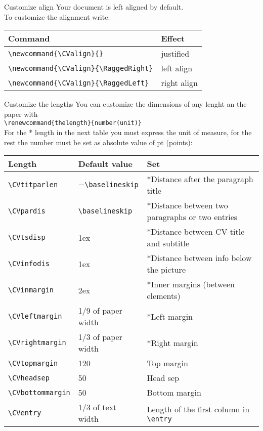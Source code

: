 \documentclass[english]{michael-cv}
\begin{document}
\begin{para}{Customize align}
Your document is left aligned by default.\\
To customize the alignment write:\\[1ex]
\begin{tabular}{ll}
\toprule
Command				& Effect\\
\midrule
\verb+\newcommand{\CValign}{}+	& justified	\\
\verb+\newcommand{\CValign}{\RaggedRight}+	& left align	\\
\verb+\newcommand{\CValign}{\RaggedLeft}+	& right align	\\
\bottomrule
\end{tabular}
\end{para}

\newpage
\begin{para}{Customize the lengths}
You can customize the dimensions of any lenght an the paper with\\
\null\hspace{4ex}\verb+\renewcommand{thelength}{number(unit)}+\\[1ex]
For the * length in the next table you must express the unit of measure, for the rest the number must be set as absolute value of pt (points):\\[1ex]
\begin{tabular}{llp{140pt}}
\toprule
Length			& Default value	& Set	\\
\midrule
\verb+\CVtitparlen+	& $-$\verb+\baselineskip+	& *Distance after the paragraph title	\\
\verb+\CVpardis+	& \verb+\baselineskip+	& *Distance between two paragraphs or two entries	\\
\verb+\CVtsdisp+	& 1ex			& *Distance between CV title and subtitle	\\
\verb+\CVinfodis+	& 1ex			& *Distance between info below the picture		\\
\verb+\CVinmargin+	& 2ex			& *Inner margins (between elements)	\\
\verb+\CVleftmargin+	& 1/9 of paper width	& *Left margin	\\
\verb+\CVrightmargin+	& 1/3 of paper width	& *Right margin	\\
\verb+\CVtopmargin+	& 120			& Top margin	\\
\verb+\CVheadsep+	& 50			& Head sep	\\
\verb+\CVbottommargin+	& 50			& Bottom margin	\\
\verb+\CVentry+		& 1/3 of text width	& Length of the first column in \verb+\entry+	\\

\end{tabular}
\end{para}
\end{document}
